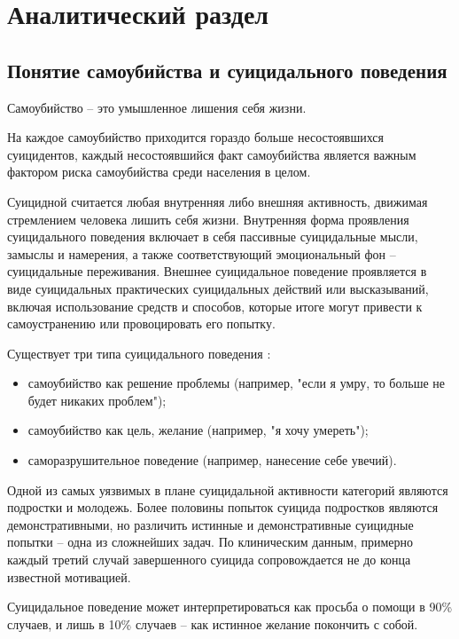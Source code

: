 \section{Аналитический раздел}

\subsection{Понятие самоубийства и суицидального поведения}
Самоубийство -- это умышленное лишения себя жизни. \cite{fuckingSuicideDefinition}

На каждое самоубийство приходится гораздо больше несостоявшихся суицидентов, каждый несостоявшийся факт самоубийства является важным фактором риска самоубийства среди населения в целом. \cite{suicideVOZDouble}

Суицидной считается любая внутренняя либо внешняя активность, движимая стремлением человека лишить себя жизни. Внутренняя форма проявления суицидального поведения включает в себя пассивные суицидальные мысли, замыслы и намерения, а также соответствующий эмоциональный фон -- суицидальные переживания. Внешнее суицидальное поведение проявляется в виде суицидальных практических суицидальных действий или высказываний, включая использование средств и способов, которые  итоге могут привести к самоустранению или провоцировать его попытку. \cite{suicidalContent}

Существует три типа суицидального поведения \cite{Kasyanov}:
\begin{itemize}
\item самоубийство как решение проблемы (например, "если я умру, то больше не будет никаких проблем");
\item самоубийство как цель, желание (например, "я хочу умереть");
\item саморазрушительное поведение (например, нанесение себе увечий).
\end{itemize}

Одной из самых уязвимых в плане суицидальной активности категорий являются подростки и молодежь. Более половины попыток суицида подростков являются демонстративными, но различить истинные и демонстративные суицидные попытки -- одна из сложнейших задач. По клиническим данным, примерно каждый третий случай завершенного суицида сопровождается не до конца известной мотивацией. \cite{suicidalContent}

Суицидальное поведение может интерпретироваться как просьба о помощи в 90\% случаев, и лишь в 10\% случаев -- как истинное желание покончить с собой. \cite{Kasyanov}

